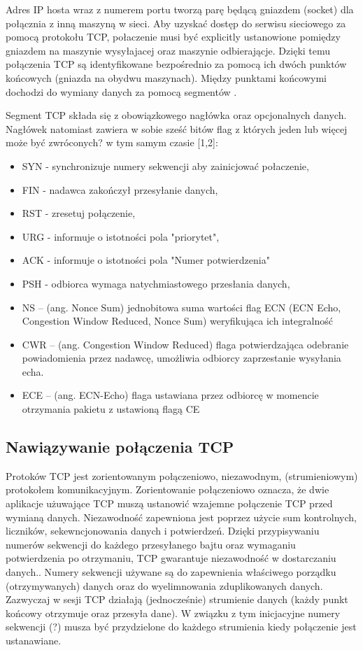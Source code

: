 Adres IP hosta wraz z numerem portu tworzą parę będącą gniazdem (socket) dla połącznia z inną maszyną w sieci. Aby uzyskać dostęp do serwisu sieciowego za pomocą protokołu TCP, połaczenie musi być explicitly ustanowione pomiędzy gniazdem na maszynie wysyłajacej oraz maszynie odbierającje. Dzięki temu połączenia TCP są identyfikowane bezpośrednio za pomocą ich dwóch punktów końcowych (gniazda na obydwu maszynach). Między punktami końcowymi dochodzi do wymiany danych za pomocą segmentów \cite{vivio2002}.

Segment TCP składa się z obowiązkowego nagłówka oraz opcjonalnych danych. Nagłówek natomiast zawiera w sobie sześć bitów flag z których jeden lub więcej może być zwróconych? w tym samym czasie [1,2]:
\begin{itemize}
\item SYN - synchronizuje numery sekwencji aby zainicjować połaczenie,
\item FIN - nadawca zakończył przesyłanie danych,
\item RST - zresetuj połączenie,
\item URG - informuje o istotności pola "priorytet",
\item ACK - informuje o istotności pola "Numer potwierdzenia"
\item PSH - odbiorca wymaga natychmiastowego przesłania danych,

\item NS – (ang. Nonce Sum) jednobitowa suma wartości flag ECN (ECN Echo, Congestion Window Reduced, Nonce Sum) weryfikująca ich integralność
\item CWR – (ang. Congestion Window Reduced) flaga potwierdzająca odebranie powiadomienia przez nadawcę, umożliwia odbiorcy zaprzestanie wysyłania echa.
\item ECE – (ang. ECN-Echo) flaga ustawiana przez odbiorcę w momencie otrzymania pakietu z ustawioną flagą CE

\end{itemize}  

\subsection{Nawiązywanie połączenia TCP}

Protoków TCP jest zorientowanym połączeniowo, niezawodnym, (strumieniowym) protokołem komunikacyjnym. Zorientowanie połączeniowo oznacza, że dwie aplikacje użuwające TCP muszą ustanowić wzajemne połączenie TCP przed wymianą danych. Niezawodność zapewniona jest poprzez użycie sum kontrolnych, liczników, sekewncjonowania danych i potwierdzeń. Dzięki przypisywaniu numerów sekwencji do każdego przesyłanego bajtu oraz wymaganiu potwierdzenia po otrzymaniu, TCP gwarantuje niezawodność w dostarczaniu danych.. Numery sekwencji używane są do zapewnienia właściwego porządku (otrzymywanych) danych oraz do wyelimnowania zduplikowanych danych. Zazwyczaj w sesji TCP działają (jednocześnie) strumienie danych (każdy punkt końcowy otrzymuje oraz przesyła dane). W związku z tym inicjacyjne numery sekwencji (?) musza być przydzielone do każdego strumienia kiedy połączenie jest ustanawiane.\

